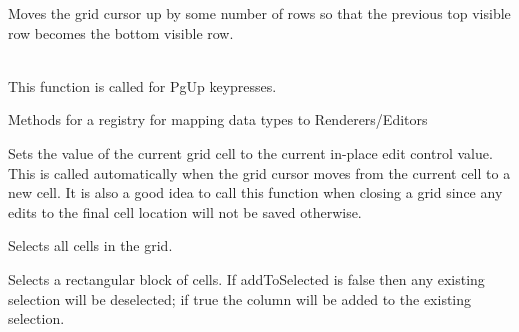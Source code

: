 \label{wxgridmovepageup}


Moves the grid cursor up by some number of rows so that the previous top visible row
becomes the bottom visible row.

\\
This function is called for PgUp keypresses.



\label{wxgridregisterdatatype}


Methods for a registry for mapping data types to Renderers/Editors



\label{wxgridsaveeditcontrolvalue}


Sets the value of the current grid cell to the current in-place edit control value.
This is called automatically when the grid cursor moves from the current cell to a
new cell. It is also a good idea to call this function when closing a grid since
any edits to the final cell location will not be saved otherwise.



\label{wxgridselectall}


Selects all cells in the grid.



\label{wxgridselectblock}



Selects a rectangular block of cells. If addToSelected is false then any existing selection will be
deselected; if true the column will be added to the existing selection.



